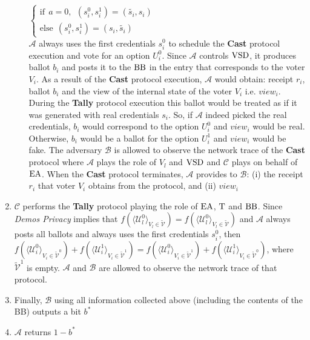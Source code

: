 \begin{enumerate}
\begin{enumerate}
$ \begin{cases}
 \text{if} ~~a =0,~~ (s^0_i,s^1_i) = (\tilde{s_i},s_i)  \\ 
 \text{else}~~  (s^0_i,s^1_i) = (s_i,\tilde{s_i})
\end{cases}$\\
$\mathcal{A}$ always uses the first credentials $s^0_i$ to schedule the \textbf{Cast} protocol execution and vote for an option $U^0_i$. Since  $\mathcal{A}$  controls $\operatorname{VSD}$, it produces ballot $b_i$ and posts it to the $\operatorname{BB}$ in the entry that corresponds to the voter $V_i$. As a result of the \textbf{Cast} protocol execution, $\mathcal{A}$ would obtain: receipt $r_i$, ballot $b_i$ and the view of the internal state of the voter $V_i$ i.e. $view_i$.  During the \textbf{Tally} protocol execution this ballot would be treated as if it was generated with real credentials $s_i$. So, if  $\mathcal{A}$ indeed picked the real credentials, $b_i$ would correspond to the option   $U^0_i$  and $view_i$ would be real. Otherwise, $b_i$ would be a ballot for the option  $U^1_i$ and $view_i$ would be fake. The adversary  $\mathcal{B}$ is allowed to observe the network trace of the \textbf{Cast} protocol where  $\mathcal{A}$ plays the role of $V_l$ and $\operatorname{VSD}$ and  $\mathcal{C}$ plays on behalf of $\operatorname{EA}$. When the  \textbf{Cast} protocol terminates, $\mathcal{A}$ provides to $\mathcal{B}$: (i) the receipt $r_i$ that voter $V_i$ obtains from the protocol, and (ii) $view_i$ \end{enumerate}
\item $\mathcal{C}$ performs the \textbf{Tally} protocol playing the role of $\operatorname{EA}$, $\operatorname{T}$  and $\operatorname{BB}$. Since \textit{Demos Privacy} implies that  $f(\langle \mathcal{U}^0_l \rangle _{V_l \in \tilde{\mathcal{V}}} ) = f(\langle \mathcal{U}^0_l \rangle _{V_l \in \tilde{\mathcal{V}}})$ and  $\mathcal{A}$ always posts all ballots and always uses the first credentials $s_i^0$, then  $f(\langle \mathcal{U}^0_i \rangle _{V_i \in \tilde{\mathcal{V}}^0} ) + f(\langle \mathcal{U}^1_i \rangle _{V_i \in \tilde{\mathcal{V}}^1} ) =  f(\langle \mathcal{U}^0_i \rangle _{V_i \in \tilde{\mathcal{V}}^1} ) +  f(\langle \mathcal{U}^1_i \rangle _{V_i \in \tilde{\mathcal{V}}^0} )$, where $\tilde{\mathcal{V}}^1$ is empty.  $\mathcal{A}$ and  $\mathcal{B}$ are allowed to observe the network trace of that protocol. 
\item Finally, $\mathcal{B}$ using all information collected above (including the contents of the BB) outputs a bit $b^*$
\item $\mathcal{A}$ returns $1 - b^*$
 \end{enumerate} 
 
